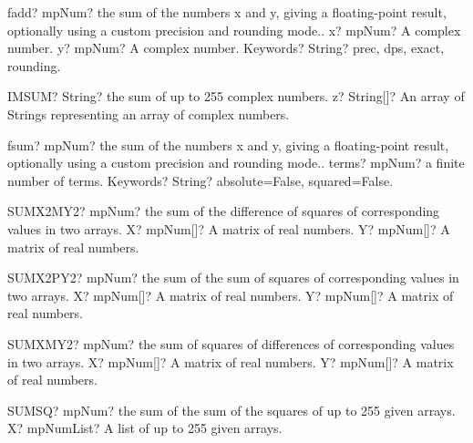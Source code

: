 \documentclass[12pt,a4paper,openany]{book}
\begin{document}
\begin{mpFunctionsExtract}
\mpFunctionThree
{fadd? mpNum? the sum of the numbers x and y, giving a floating-point result, optionally using a custom precision and rounding mode..}
{x? mpNum? A complex number.}
{y? mpNum? A complex number.}
{Keywords? String? prec, dps, exact, rounding.}
\end{mpFunctionsExtract}

\begin{mpFunctionsExtract}
\mpWorksheetFunctionOneNotImplemented
{IMSUM? String? the sum of up to 255 complex numbers.}
{z? String[]? An array of Strings representing an array of complex numbers.}
\end{mpFunctionsExtract}

\begin{mpFunctionsExtract}
\mpFunctionTwo
{fsum? mpNum? the sum of the numbers x and y, giving a floating-point result, optionally using a custom precision and rounding mode..}
{terms? mpNum? a finite number of terms.}
{Keywords? String? absolute=False, squared=False.}
\end{mpFunctionsExtract}

\begin{mpFunctionsExtract}
\mpWorksheetFunctionTwoNotImplemented
{SUMX2MY2? mpNum? the sum of the difference of squares of corresponding values in two arrays.}
{X? mpNum[]? A matrix of real numbers.}
{Y? mpNum[]? A matrix of real numbers.}
\end{mpFunctionsExtract}

\begin{mpFunctionsExtract}
\mpWorksheetFunctionTwoNotImplemented
{SUMX2PY2? mpNum? the sum of the sum of squares of corresponding values in two arrays.}
{X? mpNum[]? A matrix of real numbers.}
{Y? mpNum[]? A matrix of real numbers.}
\end{mpFunctionsExtract}

\begin{mpFunctionsExtract}
\mpWorksheetFunctionTwoNotImplemented
{SUMXMY2? mpNum? the sum of squares of differences of corresponding values in two arrays.}
{X? mpNum[]? A matrix of real numbers.}
{Y? mpNum[]? A matrix of real numbers.}
\end{mpFunctionsExtract}

\begin{mpFunctionsExtract}
\mpWorksheetFunctionOneNotImplemented
{SUMSQ? mpNum? the sum of the sum of the squares of up to 255 given arrays.}
{X? mpNumList? A list of up to 255 given arrays.}
\end{mpFunctionsExtract}
\end{document}
